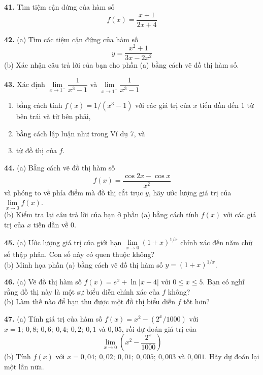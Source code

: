 \noindent
\begin{minipage}[t]{0.475\textwidth}
  \textbf{41.} Tìm tiệm cận đứng của hàm số
  \[
    f(x) = \frac{x + 1}{2x + 4}
  \]

  \textbf{42.} (a) Tìm các tiệm cận đứng của hàm số
  \[
    y = \frac{x^2 + 1}{3x - 2x^2}
  \]
  \llap{\graphicon\hspace{5pt}}(b) Xác nhận câu trả lời của bạn cho phần (a) bằng cách vẽ đồ thị hàm số.

  \textbf{43.} Xác định $\lim\limits_{x \to 1^-} \dfrac{1}{x^3 - 1}$ và $\lim\limits_{x \to 1^+} \dfrac{1}{x^3 - 1}$
  \begin{enumerate}[label=(\alph*), itemsep=1.5pt, topsep=2pt, parsep=0pt, leftmargin=1.5em]
    \item bằng cách tính $f(x) = 1/(x^3 - 1)$ với các giá trị của $x$ tiến dần đến $1$ từ bên trái và từ bên phải,
    \item bằng cách lập luận như trong Ví dụ 7, và
    \item[\llap{\graphicon\hspace{5pt}}(c)] từ đồ thị của $f$.
  \end{enumerate}

  \llap{\graphicon\hspace{5pt}}\textbf{44.} (a) Bằng cách vẽ đồ thị hàm số
  \[
    f(x) = \frac{\cos 2x - \cos x}{x^2}
  \]
  và phóng to về phía điểm mà đồ thị cắt trục $y$, hãy ước lượng giá trị của $\lim\limits_{x \to 0} f(x)$.\\[2pt]
  (b) Kiểm tra lại câu trả lời của bạn ở phần (a) bằng cách tính $f(x)$ với các giá trị của $x$ tiến dần về $0$.

  \textbf{45.} (a) Ước lượng giá trị của giới hạn $\lim\limits_{x \to 0} (1 + x)^{1/x}$ chính xác đến năm chữ số thập phân. Con số này có quen thuộc không?\\
  \llap{\graphicon\hspace{5pt}}(b) Minh họa phần (a) bằng cách vẽ đồ thị hàm số $y = (1 + x)^{1/x}$.

  \llap{\graphicon\hspace{5pt}}\textbf{46.} (a) Vẽ đồ thị hàm số $f(x) = e^x + \ln|x - 4|$ với $0 \leqslant x \leqslant 5$. Bạn có nghĩ rằng đồ thị này là một sự biểu diễn chính xác của $f$ không?\\
  (b) Làm thế nào để bạn thu được một đồ thị biểu diễn $f$ tốt hơn?

  \textbf{47.} (a) Tính giá trị của hàm số $f(x) = x^2 - (2^x/1000)$ với $x = 1;\ 0{,}8;\ 0{,}6;\ 0{,}4;\ 0{,}2;\ 0{,}1$ và $0{,}05$, rồi dự đoán giá trị của
  \[
    \lim_{x \to 0} \left(x^2 - \frac{2^x}{1000}\right)
  \]
  (b) Tính $f(x)$ với $x = 0{,}04;\ 0{,}02;\ 0{,}01;\ 0{,}005;\ 0{,}003$ và $0{,}001$. Hãy dự đoán lại một lần nữa.
\end{minipage}%
